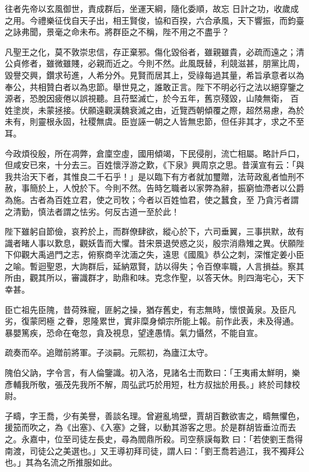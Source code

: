 \begin{pinyinscope}
 往者先帝以玄風御世，責成群后，坐運天綱，隨化委順，故忘
 日計之功，收歲成之用。今禮樂征伐自天子出，相王賢俊，協和百揆，六合承風，天下響振，而鈞臺之詠弗聞，景毫之命未布。將群臣之不稱，陛不用之不盡乎？



 凡聖王之化，莫不敦崇忠信，存正棄邪。傷化毀俗者，雖親雖貴，必疏而遠之；清公貞修者，雖微雖賤，必親而近之。今則不然。此風既替，利競滋甚，朋黨比周，毀譽交興，鑽求茍進，人希分外。見賢而居其上，受祿每過其量，希旨承意者以為奉公，共相贊白者以為忠節。舉世見之，誰敢正言。陛下不明必行之法以絕穿鑒之源者，恐脫因疲倦以誤視聽。且苻堅滅亡，於今五年，舊京殘毀，山陵無衛，
 百姓塗炭，未蒙拯接。伏願遠觀漢魏衰滅之由，近覽西朝傾覆之際，超然易慮，為於未有，則靈根永固，社稷無虞。臣豈誣一朝之人皆無忠節，但任非其才，求之不至耳。



 今政煩役殷，所在凋弊，倉廩空虛，國用傾竭，下民侵削，流亡相屬。略計戶口，但咸安已來，十分去三。百姓懷浮游之歎，《下泉》興周京之思。昔漢宣有云：「與我共治天下者，其惟良二千石乎！」是以臨下有方者就加璽贈，法苛政亂者恤刑不赦，事簡於上，人悅於下。今則不然。告時乞職者以家弊為辭，振窮恤滯者以公爵為施。古者為百姓立君，使之司牧；今者以百姓恤君，使之蠶食，至
 乃貪污者謂之清勤，慎法者謂之怯劣。何反古道一至於此！



 陛下雖躬自節儉，哀矜於上，而群僚肆欲，縱心於下，六司垂翼，三事拱默，故有識者睹人事以歎息，觀妖眚而大懼。昔宋景退熒惑之災，殷宗消鼎雉之異。伏願陛下仰觀大禹過門之志，俯察商辛沈湎之失，遠思《國風》恭公之刺，深惟定姜小臣之喻。暫迴聖恩，大詢群后，延納眾賢，訪以得失；令百僚率職，人言損益。察其所由，觀其所以，審識群才，助鼎和味。克念作聖，以答天休。則四海宅心，天下幸甚。



 臣亡祖先臣隗，昔荷殊寵，匪躬之操，猶存舊史，有志無時，懷恨黃泉。及臣凡劣，復蒙罔極
 之眷，恩隆累世，實非糜身傾宗所能上報。前作此表，未及得通。暴嬰篤疾，恐命在奄忽，貪及視息，望達愚情。氣力懾然，不能自宣。



 疏奏而卒。追贈前將軍。子淡嗣。元熙初，為廬江太守。



 隗伯父訥，字令言，有人倫鑒識。初入洛，見諸名士而歎曰：「王夷甫太鮮明，樂彥輔我所敬，張茂先我所不解，周弘武巧於用短，杜方叔拙於用長。」終於司隸校尉。



 子疇，字王喬，少有美譽，善談名理。曾避亂塢壁，賈胡百數欲害之，疇無懼色，援笳而吹之，為《出塞》、《入塞》之聲，以動其游客之思。於是群胡皆垂泣而去之。永嘉中，位至司徒左長史，尋為閻鼎所殺。司空蔡謨每歎
 曰：「若使劉王喬得南渡，司徒公之美選也。」又王導初拜司徒，謂人曰：「劉王喬若過江，我不獨拜公也。」其為名流之所推服如此。




\end{pinyinscope}
